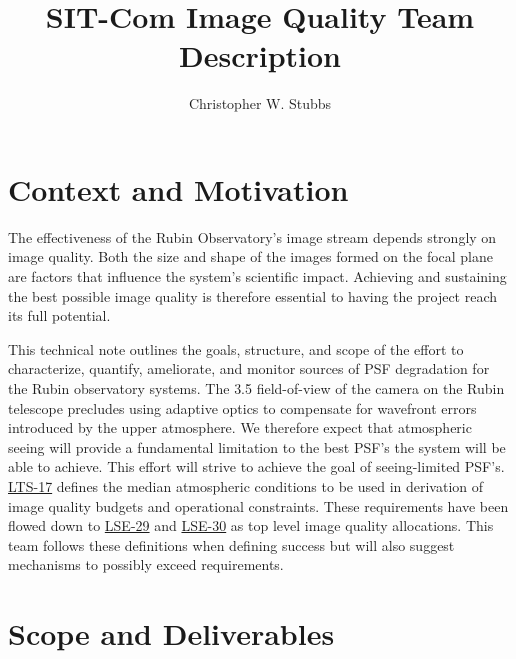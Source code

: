 \documentclass[SE,authoryear,toc]{lsstdoc}
\title{SIT-Com Image Quality Team Description}
\author{%
Christopher W. Stubbs
}
\date{\vcsDate}
\begin{document}
\maketitle


\section{Context and Motivation}

The effectiveness of the Rubin Observatory's image stream depends strongly on image quality.
Both the size and shape of the images formed on the focal plane are factors that influence the system's scientific impact.
Achieving and sustaining the best possible image quality is therefore essential to having the project reach its full potential.

This technical note outlines the goals, structure, and scope of the effort to characterize, quantify, ameliorate, and monitor sources of PSF degradation for the Rubin observatory systems.
The {3.5\textdegree} field-of-view of the camera on the Rubin telescope precludes using adaptive optics to compensate for wavefront errors introduced by the upper atmosphere.
We therefore expect that atmospheric seeing will provide a fundamental limitation to the best PSF's the system will be able to achieve.
This effort will strive to achieve the goal of seeing-limited PSF's.
\href{https://ls.st/LPM-17}{LTS-17} defines the median atmospheric conditions to be used in derivation of image quality budgets and operational constraints.
These requirements have been flowed down to \href{https://ls.st/LSE-29}{LSE-29} and \href{https://ls.st/LSE-30}{LSE-30} as top level image quality allocations.
This team follows these definitions when defining success but will also suggest mechanisms to possibly exceed requirements.

\section{Scope and Deliverables}
\end{document}
